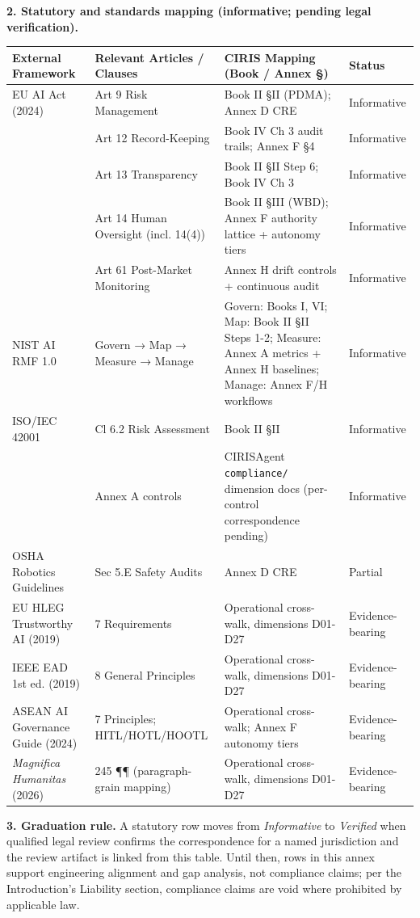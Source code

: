 \documentclass[11pt]{article}
\begin{document}
\textbf{2. Statutory and standards mapping (informative; pending legal verification).}


{\scriptsize
\begin{longtable}{|p{4.0cm}|p{4.0cm}|p{4.0cm}|p{4.0cm}|}\hline
\textbf{External Framework} & \textbf{Relevant Articles / Clauses} & \textbf{CIRIS Mapping (Book / Annex §)} & \textbf{Status} \\ \hline\endhead
EU AI Act (2024) & Art 9 Risk Management & Book II §II (PDMA); Annex D CRE & Informative \\ \hline
 & Art 12 Record-Keeping & Book IV Ch 3 audit trails; Annex F §4 & Informative \\ \hline
 & Art 13 Transparency & Book II §II Step 6; Book IV Ch 3 & Informative \\ \hline
 & Art 14 Human Oversight (incl. 14(4)) & Book II §III (WBD); Annex F authority lattice + autonomy tiers & Informative \\ \hline
 & Art 61 Post-Market Monitoring & Annex H drift controls + continuous audit & Informative \\ \hline
NIST AI RMF 1.0 & Govern → Map → Measure → Manage & Govern: Books I, VI; Map: Book II §II Steps 1-2; Measure: Annex A metrics + Annex H baselines; Manage: Annex F/H workflows & Informative \\ \hline
ISO/IEC 42001 & Cl 6.2 Risk Assessment & Book II §II & Informative \\ \hline
 & Annex A controls & CIRISAgent \texttt{compliance/} dimension docs (per-control correspondence pending) & Informative \\ \hline
OSHA Robotics Guidelines & Sec 5.E Safety Audits & Annex D CRE & Partial \\ \hline
EU HLEG Trustworthy AI (2019) & 7 Requirements & Operational cross-walk, dimensions D01-D27 & Evidence-bearing \\ \hline
IEEE EAD 1st ed. (2019) & 8 General Principles & Operational cross-walk, dimensions D01-D27 & Evidence-bearing \\ \hline
ASEAN AI Governance Guide (2024) & 7 Principles; HITL/HOTL/HOOTL & Operational cross-walk; Annex F autonomy tiers & Evidence-bearing \\ \hline
\textit{Magnifica Humanitas} (2026) & 245 ¶¶ (paragraph-grain mapping) & Operational cross-walk, dimensions D01-D27 & Evidence-bearing \\ \hline
\end{longtable}}


\textbf{3. Graduation rule.} A statutory row moves from \textit{Informative} to \textit{Verified} when qualified legal review confirms the correspondence for a named jurisdiction and the review artifact is linked from this table. Until then, rows in this annex support engineering alignment and gap analysis, not compliance claims; per the Introduction's Liability section, compliance claims are void where prohibited by applicable law.
\end{document}
